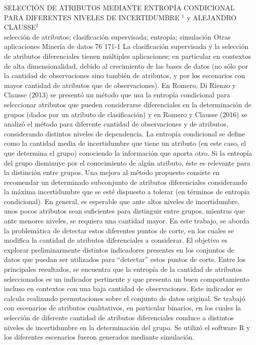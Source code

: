 \A
{SELECCIÓN DE ATRIBUTOS MEDIANTE ENTROPÍA CONDICIONAL PARA DIFERENTES NIVELES DE INCERTIDUMBRE}
{$^1$ y ALEJANDRO CLAUSSE$^2$}
{
\\}
{selección de atributos; clasificación supervisada; entropía; simulación} 
 {Otras aplicaciones} 
 {Minería de datos} 
 {76} 
 {171-1}
{La clasificación supervisada y la selección de atributos diferenciales tienen múltiples aplicaciones; en particular en contextos de alta dimensionalidad, debido al crecimiento de las bases de datos (no sólo por la cantidad de observaciones sino también de atributos, y por los escenarios con mayor cantidad de atributos que de observaciones). En Romero, Di Rienzo y Clausse (2013) se presentó un método que usa la entropía condicional para seleccionar atributos que pueden considerarse diferenciales en la determinación de grupos (dados por un atributo de clasificación) y en Romero y Clausse (2016) se analizó el método para diferente cantidad de observaciones y de atributos, considerando distintos niveles de dependencia. La entropía condicional se define como la cantidad media de incertidumbre que tiene un atributo (en este caso, el que determina el grupo) conociendo la información que aporta otro. Si la entropía del grupo disminuye por el conocimiento de algún atributo, éste es relevante para la distinción entre grupos. Una mejora al método propuesto consiste en recomendar un determinado subconjunto de atributos diferenciales considerando la máxima incertidumbre que se esté dispuesto a tolerar (en términos de entropía condicional). En general, es esperable que ante altos niveles de incertidumbre, unos pocos atributos sean suficientes para distinguir entre grupos, mientras que ante menores niveles, se requiera una cantidad mayor. En este trabajo, se aborda la problemática de detectar estos diferentes puntos de corte, en los cuales se modifica la cantidad de atributos diferenciales a considerar. El objetivo es explorar preliminarmente distintos indicadores presentes en los conjuntos de datos que puedan ser utilizados para “detectar” estos puntos de corte. Entre los principales resultados, se encuentra que la entropía de la cantidad de atributos seleccionados es un indicador pertinente y que presenta un buen comportamiento incluso en contextos con una baja cantidad de observaciones. Este indicador se calcula realizando permutaciones sobre el conjunto de datos original. Se trabajó con escenarios de atributos cualitativos, en particular binarios, en los cuales la selección de diferente cantidad de atributos diferenciales conduce a distintos niveles de incertidumbre en la determinación del grupo. Se utilizó el software R y los diferentes escenarios fueron generados mediante simulación.}
